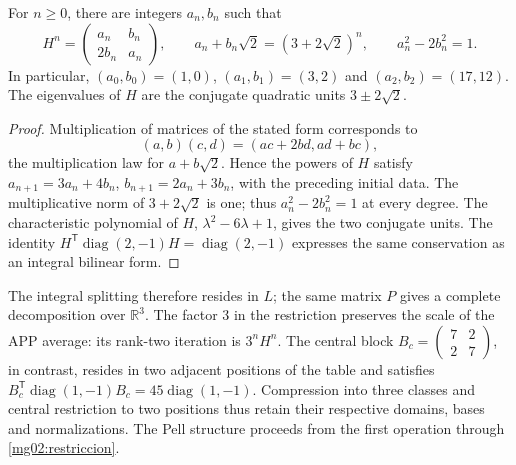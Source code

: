 \begin{corollary}
For \(n\geq0\), there are integers \(a_n,b_n\) such that
\begin{equation}
 H^n=\begin{pmatrix}a_n&b_n\\2b_n&a_n\end{pmatrix},\qquad
 a_n+b_n\sqrt2=(3+2\sqrt2)^n,
 \qquad a_n^2-2b_n^2=1.
 \label{mg02:pell}
\end{equation}
In particular, \((a_0,b_0)=(1,0)\), \((a_1,b_1)=(3,2)\) and
\((a_2,b_2)=(17,12)\). The eigenvalues of \(H\) are the conjugate
quadratic units \(3\pm2\sqrt2\).
\end{corollary}

\begin{proof}
Multiplication of matrices of the stated form corresponds to
\[
 (a,b)(c,d)=(ac+2bd,ad+bc),
\]
the multiplication law for \(a+b\sqrt2\). Hence the powers of
\(H\) satisfy \(a_{n+1}=3a_n+4b_n\), \(b_{n+1}=2a_n+3b_n\),
with the preceding initial data. The multiplicative norm of
\(3+2\sqrt2\) is one; thus \(a_n^2-2b_n^2=1\) at every degree.
The characteristic polynomial of \(H\), \(\lambda^2-6\lambda+1\),
gives the two conjugate units. The identity
\(H^{\mathsf T}\operatorname{diag}(2,-1)H=
\operatorname{diag}(2,-1)\) expresses the same conservation as an
integral bilinear form.
\end{proof}

The integral splitting therefore resides in \(L\); the same matrix
\(P\) gives a complete decomposition over \(\mathbb R^3\). The
factor \(3\) in the restriction preserves the scale of the APP
average: its rank-two iteration is \(3^nH^n\). The central block
\(B_c=\left(\begin{smallmatrix}7&2\\2&7\end{smallmatrix}\right)\),
in contrast, resides in two adjacent positions of the table and satisfies
\(B_c^{\mathsf T}\operatorname{diag}(1,-1)B_c=
45\operatorname{diag}(1,-1)\). Compression into three classes and
central restriction to two positions thus retain their respective
domains, bases and normalizations. The Pell structure proceeds from
the first operation through \eqref{mg02:restriccion}.
